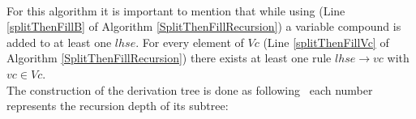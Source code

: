 \noindent
{}
\\
For this algorithm it is important to mention that while using  (Line \ref{splitThenFillB} of Algorithm \ref{SplitThenFillRecursion}) a variable compound is added to at least one $lhse$. For every element of $Vc$ (Line \ref{splitThenFillVc} of Algorithm \ref{SplitThenFillRecursion}) there exists at least one rule $lhse \rightarrow vc$ with $vc \in Vc$.\\
The construction of the derivation tree is done as following \textendash~each number represents the recursion depth of its subtree: 

